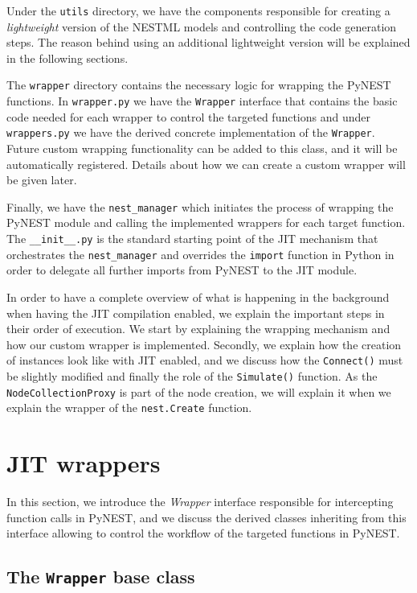 Under the \texttt{utils} directory, we have the components responsible for creating a \emph{lightweight} version of the NESTML models and controlling the code generation steps. The reason behind using an additional lightweight version will be explained in the following sections.

The \texttt{wrapper} directory contains the necessary logic for wrapping the PyNEST functions. In \texttt{wrapper.py} we have the \texttt{Wrapper} interface that contains the basic code needed for each wrapper to control the targeted functions and under \texttt{wrappers.py} we have the derived concrete implementation of the \texttt{Wrapper}. Future custom wrapping functionality can be added to this class, and it will be automatically registered. Details about how we can create a custom wrapper will be given later.

Finally, we have the \texttt{nest\_manager} which initiates the process of wrapping the PyNEST module and calling the implemented wrappers for each target function. The \texttt{\_\_init\_\_.py} is the standard starting point of the JIT mechanism that orchestrates the \texttt{nest\_manager} and overrides the \texttt{import} function in Python in order to delegate all further imports from PyNEST to the JIT module.

In order to have a complete overview of what is happening in the background when having the JIT compilation enabled, we explain the important steps in their order of execution. We start by explaining the wrapping mechanism and how our custom wrapper is implemented. Secondly, we explain how the creation of instances look like with JIT enabled, and we discuss how the \texttt{Connect()} must be slightly modified and finally the role of the \texttt{Simulate()} function. As the \texttt{NodeCollectionProxy} is part of the node creation, we will explain it when we explain the wrapper of the \texttt{nest.Create} function.

\section{JIT wrappers}

In this section, we introduce the \emph{Wrapper} interface responsible for intercepting function calls in PyNEST, and we discuss the derived classes inheriting from this interface allowing to control the workflow of the targeted functions in PyNEST.

\subsection{The \texttt{Wrapper} base class}

